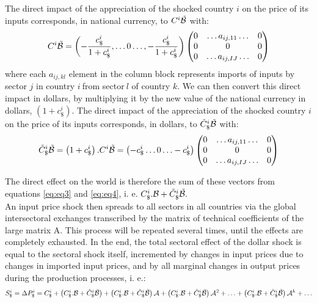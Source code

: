 \documentclass[11pt,a4paper]{article}
\begin{document}
The direct impact of the appreciation of the shocked country $i$ on the price of its inputs corresponds, in national currency, to $C^i{\tilde{{\cal B}}}$ with: 
\begin{eqnarray}
C^i{\tilde{{\cal B}}}=\left(-\frac{c_\$^i}{1+c_\$^i},\ldots0\ldots,-\frac{c_\$^i}{1+c_\$^i} \right)\left(\begin{matrix}0&\ldots{{{a}}_{ij,11}}\ldots&0\\0&0&0\\0&\ldots{{a}_{{ij,IJ}}}\ldots&0\\\end{matrix}\right) 
\label{eq:eq4}
 \end{eqnarray}
where each ${{{a}}_{{ij,kl}}}$ element in the column block represents imports of inputs by sector $j$ in country $i~$from sector$~l$ of country $k$.
We can then convert this direct impact in dollars, by multiplying it by the new value of the national currency in dollars, $\left(1+c_\$^i\right)$. The direct impact of the appreciation of the shocked country $i$ on the price of its inputs corresponds, in dollars, to ${\tilde{C}_\$^i}{\tilde{{\cal B}}}$ with: 
\begin{eqnarray}
{\tilde{C}_\$^i}{\tilde{{\cal B}}}=\left(1+c_\$^i\right).C^i{\tilde{{\cal B}}}=
\left(-c_\$^i\ldots0\ldots-c_\$^i\right)\left(\begin{matrix}0&\ldots{{{a}}_{ij,11}}\ldots&0\\0&0&0\\0&\ldots{{a}_{{ij,IJ}}}\ldots&0\\\end{matrix}\right) 
\label{eq:eq4}
 \end{eqnarray}







The direct effect on the world is therefore the sum of these vectors from equations  \ref{eq:eq3} and \ref{eq:eq4}, i. e. $C_\$^i.{\cal B}+{\tilde{C}_\$^i}{\tilde{{\cal B}}}.~$\\
An input price shock then spreads to all sectors in all countries via the global intersectoral exchanges transcribed by the matrix of technical coefficients of the large matrix {\cal A}. This process will be repeated several times, until the effects are completely exhausted.
In the end, the total sectoral effect of the dollar shock is equal to the sectoral shock itself, incremented by changes in input prices due to changes in imported input prices, and by all marginal changes in output prices during the production processes, i. e.:\\
\begin{eqnarray*}
S_\$^i=\Delta{{P}_{\$}^i}=C_\$^i+ \left(C_\$^i.{\cal B}+{\tilde{C}_\$^i}{\tilde{{\cal B}}}\right)+ \left(C_\$^i.{\cal B}+{\tilde{C}_\$^i}{\tilde{{\cal B}}}\right){{\cal A}}+\left(C_\$^i.{\cal B}+{\tilde{C}_\$^i}{\tilde{{\cal B}}}\right){{\cal A}^{2}}+\ldots+\left(C_\$^i.{\cal B}+{\tilde{C}_\$^i}{\tilde{{\cal B}}}\right){\cal A}^k +\ldots \\
\end{eqnarray*}
\end{document}
